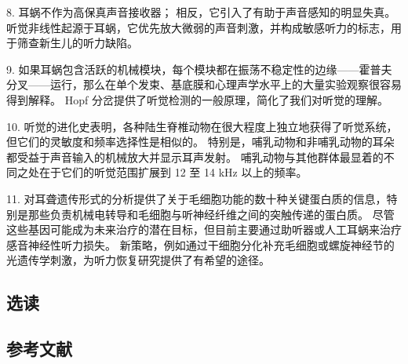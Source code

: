 8. 耳蜗不作为高保真声音接收器； 相反，它引入了有助于声音感知的明显失真。 听觉非线性起源于耳蜗，它优先放大微弱的声音刺激，并构成敏感听力的标志，用于筛查新生儿的听力缺陷。 

9. 如果耳蜗包含活跃的机械模块，每个模块都在振荡不稳定性的边缘——霍普夫分叉——运行，那么在单个发束、基底膜和心理声学水平上的大量实验观察很容易得到解释。 Hopf 分岔提供了听觉检测的一般原理，简化了我们对听觉的理解。 

10. 听觉的进化史表明，各种陆生脊椎动物在很大程度上独立地获得了听觉系统，但它们的灵敏度和频率选择性是相似的。 特别是，哺乳动物和非哺乳动物的耳朵都受益于声音输入的机械放大并显示耳声发射。 哺乳动物与其他群体最显着的不同之处在于它们的听觉范围扩展到 12 至 14 kHz 以上的频率。 

11. 对耳聋遗传形式的分析提供了关于毛细胞功能的数十种关键蛋白质的信息，特别是那些负责机械电转导和毛细胞与听神经纤维之间的突触传递的蛋白质。 尽管这些基因可能成为未来治疗的潜在目标，但目前主要通过助听器或人工耳蜗来治疗感音神经性听力损失。 新策略，例如通过干细胞分化补充毛细胞或螺旋神经节的光遗传学刺激，为听力恢复研究提供了有希望的途径。

\subsection{选读}
\subsection{参考文献}